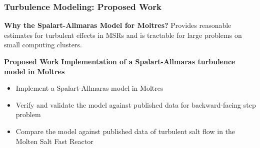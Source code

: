 \begin{frame}
  \frametitle{Turbulence Modeling: Proposed Work}
  \begin{block}{\textbf{Why the Spalart-Allmaras Model for Moltres?}}
    Provides reasonable estimates for turbulent effects in MSRs and is tractable for large problems
    on small computing clusters.
  \end{block}
  \begin{block}{\textbf{Proposed Work}}
    \textbf{Implementation of a Spalart-Allmaras turbulence model in Moltres}
    \begin{itemize}
      \item Implement a Spalart-Allmaras model in Moltres
      \item Verify and validate the model against published data for backward-facing step problem
      \item Compare the model against published data of turbulent salt flow in the Molten Salt Fast
        Reactor
    \end{itemize}
  \end{block}
\end{frame}
